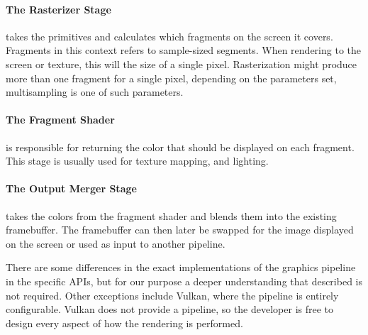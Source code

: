 \paragraph{The Rasterizer Stage} takes the primitives and calculates which fragments on the screen it covers.
Fragments in this context refers to sample-sized segments.
When rendering to the screen or texture, this will the size of a single pixel.
Rasterization might produce more than one fragment for a single pixel, depending on the parameters set, multisampling is one of such parameters.

\paragraph{The Fragment Shader} is responsible for returning the color that should be displayed on each fragment.
This stage is usually used for texture mapping, and lighting.

\paragraph{The Output Merger Stage} takes the colors from the fragment shader and blends them into the existing framebuffer. 
The framebuffer can then later be swapped for the image displayed on the screen or used as input to another pipeline.

\vspace{1em}

\noindent There are some differences in the exact implementations of the graphics pipeline in the specific \glspl{API}, but for our purpose a deeper understanding that described is not required.
Other exceptions include Vulkan, where the pipeline is entirely configurable.
Vulkan does not provide a pipeline, so the developer is free to design every aspect of how the rendering is performed. 
